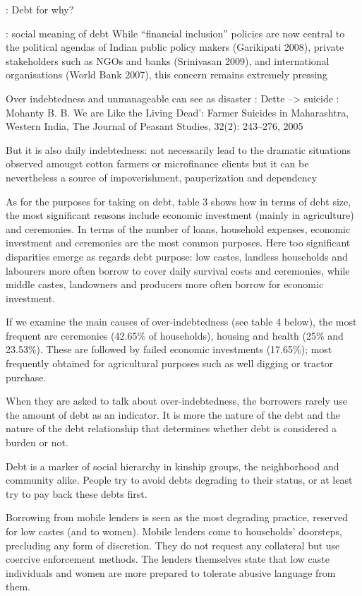 \documentclass[a4paper, 11pt, onecolumn]{article}
\begin{document}
\cite{Guerin2012} : Debt for why?



\cite{Guerin2014a} : social meaning of debt
While “financial inclusion” policies are now central to the political agendas of Indian public
policy makers (Garikipati 2008), private stakeholders such as NGOs and banks (Srinivasan
2009), and international organisations (World Bank 2007), this concern remains extremely
pressing

Over indebtedness and unmanageable can see as disaster : 
Dette --> suicide : Mohanty B. B. We are Like the Living Dead’: Farmer Suicides in Maharashtra, Western India, The Journal
of Peasant Studies, 32(2): 243–276, 2005

But it is also daily indebtedness: not necessarily lead to the dramatic situations observed amougst cotton farmers or microfinance clients but it can be nevertheless a source of impoverishment, pauperization and dependency \citep{Guerin2014a}

As for
the purposes for taking on debt, table 3 shows how in terms of debt size, the most significant
reasons include economic investment (mainly in agriculture) and ceremonies. In terms of the
number of loans, household expenses, economic investment and ceremonies are the most
common purposes. Here too significant disparities emerge as regards debt purpose: low castes, landless households and labourers more often borrow to cover daily survival costs and
ceremonies, while middle castes, landowners and producers more often borrow for economic
investment.

If we examine the main causes of over-indebtedness (see table 4 below), the most frequent are
ceremonies (42.65\% of households), housing and health (25\% and 23.53\%). These are
followed by failed economic investments (17.65\%); most frequently obtained for agricultural
purposes such as well digging or tractor purchase. 

When they are asked to talk about over-indebtedness, the borrowers rarely use
the amount of debt as an indicator. It is more the nature of the debt and the nature of the debt
relationship that determines whether debt is considered a burden or not.

Debt is a marker of social hierarchy in
kinship groups, the neighborhood and community alike. People try to avoid debts degrading
to their status, or at least try to pay back these debts first.

Borrowing from mobile lenders is seen as the most degrading practice, reserved for low castes
(and to women). Mobile lenders come to households’ doorsteps, precluding any form of
discretion. They do not request any collateral but use coercive enforcement methods. The
lenders themselves state that low caste individuals and women are more prepared to tolerate
abusive language from them.
\end{document}
